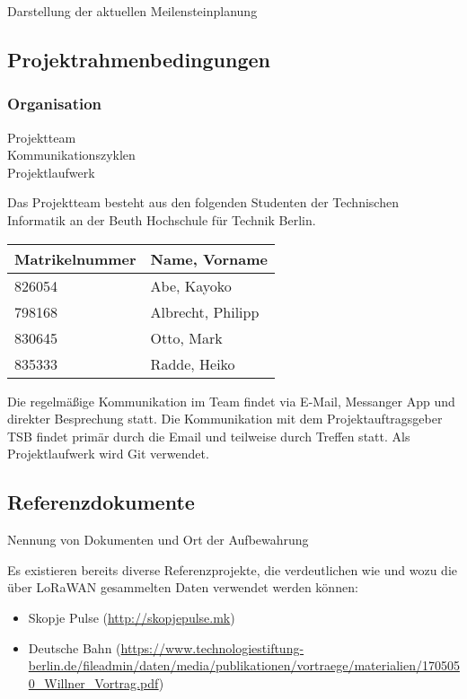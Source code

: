 \documentclass[
11pt,
a4paper,
ngerman,
]{article}
\newcommand{\descriptionWhat}[1]{%
	\begin{itshape}%
	#1 \\%
	\end{itshape}%
}
\begin{document}
\descriptionWhat{Darstellung der aktuellen Meilensteinplanung}

\subsection{Projektrahmenbedingungen}

\subsubsection{Organisation}

\descriptionWhat{ Projektteam \\ Kommunikationszyklen \\ Projektlaufwerk }

Das Projektteam besteht aus den folgenden Studenten der Technischen Informatik an der Beuth Hochschule für Technik Berlin.

\begin{table}[h]
	\centering
	\begin{tabular}{ |l|l| }
		\hline  %
		\rowcolor[gray]{.8}
		\rule{0pt}{18pt}
		\textbf{ Matrikelnummer } & \textbf{ Name, Vorname } \\
		\hline
		826054 & Abe, Kayoko \\
		\hline
		798168 & Albrecht, Philipp \\
		\hline
		830645 & Otto, Mark \\
		\hline
		835333 & Radde, Heiko \\
		\hline
	\end{tabular}
\end{table}

Die regelmäßige Kommunikation im Team findet via E-Mail, Messanger App und direkter Besprechung statt. Die Kommunikation mit dem Projektauftragsgeber TSB findet primär durch die Email und teilweise durch Treffen statt.
Als Projektlaufwerk wird Git verwendet.

\subsection{Referenzdokumente}

\descriptionWhat{ Nennung von Dokumenten und Ort der Aufbewahrung }

Es existieren bereits diverse Referenzprojekte, die verdeutlichen wie und wozu die über LoRaWAN gesammelten Daten verwendet werden können:

\begin{itemize}[noitemsep]
	\item Skopje Pulse (\url{http://skopjepulse.mk})
	\item Deutsche Bahn (\url{https://www.technologiestiftung-berlin.de/fileadmin/daten/media/publikationen/vortraege/materialien/1705050_Willner_Vortrag.pdf})
\end{itemize}
\end{document}
